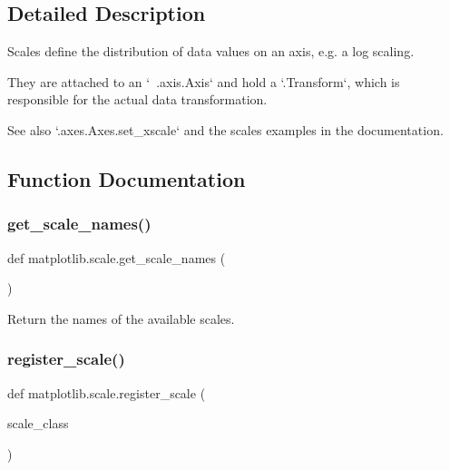 \subsection{Detailed Description}
\begin{DoxyVerb}Scales define the distribution of data values on an axis, e.g. a log scaling.

They are attached to an `~.axis.Axis` and hold a `.Transform`, which is
responsible for the actual data transformation.

See also `.axes.Axes.set_xscale` and the scales examples in the documentation.
\end{DoxyVerb}
 

\subsection{Function Documentation}
\mbox{\label{namespacematplotlib_1_1scale_aef5ece5d6c1a21c81f913a8345ff3c98}} 
\subsubsection{\texorpdfstring{get\+\_\+scale\+\_\+names()}{get\_scale\_names()}}
{\footnotesize\ttfamily def matplotlib.\+scale.\+get\+\_\+scale\+\_\+names (\begin{DoxyParamCaption}{ }\end{DoxyParamCaption})}

\begin{DoxyVerb}Return the names of the available scales.\end{DoxyVerb}
 \mbox{\label{namespacematplotlib_1_1scale_ae254463327993a3dd7e72b28186a6183}} 
\subsubsection{\texorpdfstring{register\+\_\+scale()}{register\_scale()}}
{\footnotesize\ttfamily def matplotlib.\+scale.\+register\+\_\+scale (\begin{DoxyParamCaption}\item[{}]{scale\+\_\+class }\end{DoxyParamCaption})}

